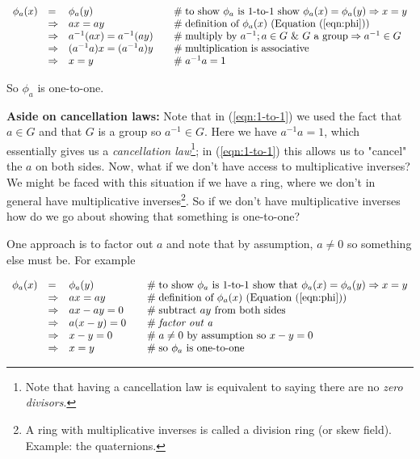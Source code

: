 \documentclass{article}
\theoremstyle{definition}
\begin{document}
\begin{equation}
\begin{array}{llll}
\phi_{a}(x)  
&=&             \phi_{a}(y)             &\quad \mathrel{\#} \text{to show $\phi_a$ is 1-to-1 show } \phi_a(x) = \phi_a(y) \Rightarrow x = y \\
&\Rightarrow&   ax = ay                 &\quad \mathrel{\#} \text{definition of $\phi_a(x)$ (Equation (\ref{eqn:phi}))} \\
&\Rightarrow&   a^{-1}(ax) = a^{-1}(ay) &\quad \mathrel{\#} \text{multiply by $a^{-1}$};  a \in G \text{ \& $G$ a group} \Rightarrow a^{-1} \in G \\
&\Rightarrow&   (a^{-1}a)x = (a^{-1}a)y &\quad \mathrel{\#} \text{multiplication is associative} \\
&\Rightarrow&   x = y                   &\quad \mathrel{\#} a^{-1}a = 1 
\end{array}
\label{eqn:1-to-1}
\end{equation}

\bigskip
\noindent
So $\phi_{a}$ is one-to-one.

\bigskip
\noindent
\textbf{Aside on cancellation laws:} Note that in
(\ref{eqn:1-to-1}) we used the fact that $a \in G$ and that $G$
is a group so $a^{-1} \in G$.  Here we have $a^{-1}a = 1$, which
essentially gives us a \emph{cancellation law}\footnote{Note that
having a cancellation law is equivalent to saying there are no
\emph{zero divisors}.}; in (\ref{eqn:1-to-1}) this allows us to
"cancel" the $a$ on both sides. Now, what if we don't have access
to multiplicative inverses? We might be faced with this situation
if we have a ring, where we don't in general have multiplicative
inverses\footnote{A ring with multiplicative inverses is called a
division ring (or skew field).  Example: the quaternions.}. So if
we don't have multiplicative inverses how do we go about showing
that something is one-to-one?

\bigskip
\noindent
One approach is to factor out $a$ and note that by assumption, $a
\neq 0$ so something else must be. For example

\begin{equation*}
\begin{array}{llll}
\phi_{a}(x)  
&=&             \phi_{a}(y)     &\quad \mathrel{\#} \text{to show $\phi_a$ is 1-to-1 show 
													that } \phi_a(x) = \phi_a(y) \Rightarrow x = y \\
&\Rightarrow&   ax = ay         &\quad \mathrel{\#} \text{definition of $\phi_a(x)$ (\text{Equation (\ref{eqn:phi}))}} \\
&\Rightarrow&   ax-ay = 0       &\quad \mathrel{\#} \text{subtract $ay$ from both sides} \\
&\Rightarrow&   a (x-y) = 0     &\quad \mathrel{\#} \textit{factor out a} \\
&\Rightarrow&   x - y = 0       &\quad \mathrel{\#} a \neq 0 \text{ by assumption so } x - y = 0  \\
&\Rightarrow&   x = y           &\quad \mathrel{\#} \text{so $\phi_{a}$ is one-to-one}
\end{array}
\end{equation*}
\end{document}
